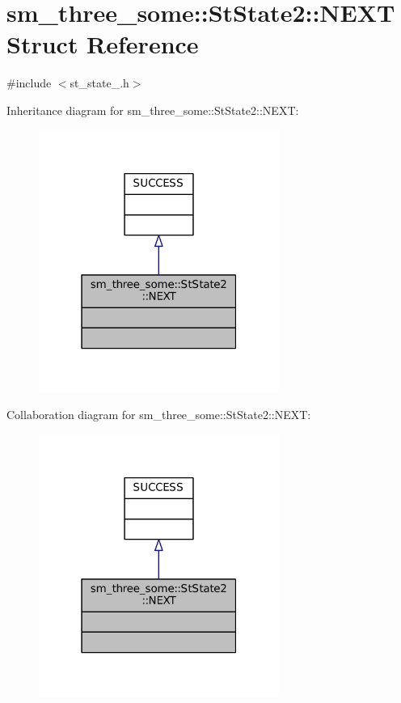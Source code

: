 \hypertarget{structsm__three__some_1_1StState2_1_1NEXT}{}\section{sm\+\_\+three\+\_\+some\+:\+:St\+State2\+:\+:N\+E\+XT Struct Reference}
\label{structsm__three__some_1_1StState2_1_1NEXT}


{\ttfamily \#include $<$st\+\_\+state\+\_.\+h$>$}



Inheritance diagram for sm\+\_\+three\+\_\+some\+:\+:St\+State2\+:\+:N\+E\+XT\+:
\nopagebreak
\begin{figure}[H]
\begin{center}
\leavevmode
\includegraphics[width=223pt]{structsm__three__some_1_1StState2_1_1NEXT__inherit__graph}
\end{center}
\end{figure}


Collaboration diagram for sm\+\_\+three\+\_\+some\+:\+:St\+State2\+:\+:N\+E\+XT\+:
\nopagebreak
\begin{figure}[H]
\begin{center}
\leavevmode
\includegraphics[width=223pt]{structsm__three__some_1_1StState2_1_1NEXT__coll__graph}
\end{center}
\end{figure}


